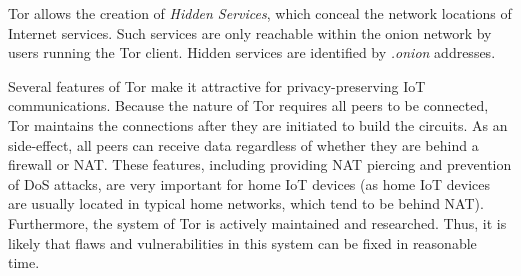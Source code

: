 Tor allows the creation of \textit{Hidden Services}, which conceal the network locations of Internet services. Such services are only reachable within the onion network by users running the Tor client. Hidden services are identified by \textit{.onion} addresses.

Several features of Tor make it attractive for privacy-preserving IoT communications. Because the nature of Tor requires all peers to be connected, Tor maintains the connections after they are initiated to build the circuits. As an side-effect, all peers can receive data regardless of whether they are behind a firewall or NAT. These features, including providing NAT piercing and prevention of DoS attacks, are very important for home IoT devices (as home IoT devices are usually located in typical home networks, which tend to be behind NAT). Furthermore, the system of Tor is actively maintained and researched. Thus, it is likely that flaws and vulnerabilities in this system can be fixed in reasonable time.